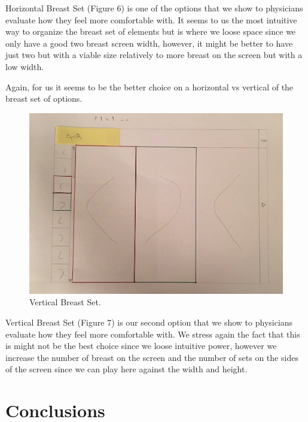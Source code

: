 Horizontal Breast Set (Figure 6) is one of the options that we show to physicians evaluate how they feel more comfortable with. It seems to us the most intuitive way to organize the breast set of elements but is where we loose space since we only have a good two breast screen width, however, it might be better to have just two but with a viable size relatively to more breast on the screen but with a low width.

Again, for us it seems to be the better choice on a horizontal vs vertical of the breast set of options.

\clearpage

\begin{figure}[!hbt]
\centering
\includegraphics[width=1.00\textwidth]{p141.png}
\caption{\label{fig:P 1.4.1}Vertical Breast Set.
}
\end{figure}

Vertical Breast Set (Figure 7) is our second option that we show to physicians evaluate how they feel more comfortable with. We stress again the fact that this is might not be the best choice since we loose intuitive power, however we increase the number of breast on the screen and the number of sets on the sides of the screen since we can play here against the width and height.

\clearpage

\section{Conclusions}



\clearpage

\begin{thebibliography}{}
\bibitem{}
\end{thebibliography}





